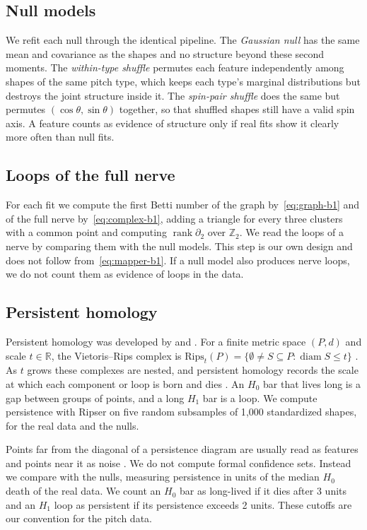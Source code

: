 \documentclass{article}
\newcommand{\R}{\mathbb{R}}
\newcommand{\Z}{\mathbb{Z}}
\DeclareMathOperator{\rank}{rank}
\DeclareMathOperator{\diam}{diam}
\theoremstyle{definition}
\theoremstyle{remark}
\begin{document}
\subsection{Null models}
We refit each null through the identical pipeline.
The \emph{Gaussian null} has the same mean and covariance as the shapes and no structure beyond these second moments.
The \emph{within-type shuffle} permutes each feature independently among shapes of the same pitch type, which keeps each type's marginal distributions but destroys the joint structure inside it.
The \emph{spin-pair shuffle} does the same but permutes $(\cos\theta, \sin\theta)$ together, so that shuffled shapes still have a valid spin axis.
A feature counts as evidence of structure only if real fits show it clearly more often than null fits.

\subsection{Loops of the full nerve}
For each fit we compute the first Betti number of the graph by~\eqref{eq:graph-b1} and of the full nerve by~\eqref{eq:complex-b1}, adding a triangle for every three clusters with a common point and computing $\rank \partial_2$ over $\Z_2$.
We read the loops of a nerve by comparing them with the null models. This step is our own design and does not follow from~\eqref{eq:mapper-b1}. If a null model also produces nerve loops, we do not count them as evidence of loops in the data.

\subsection{Persistent homology}
Persistent homology was developed by \textcite{edelsbrunnerletscherzomorodian2002} and \textcite{zomorodiancarlsson2005}.
For a finite metric space $(P, d)$ and scale $t \in \R$, the Vietoris--Rips complex is $\mathrm{Rips}_t(P) = \{ \emptyset \neq S \subseteq P : \diam S \le t \}$ \parencite{bauer2021ripser}.
As $t$ grows these complexes are nested, and persistent homology records the scale at which each component or loop is born and dies \parencite{edelsbrunnerletscherzomorodian2002,zomorodiancarlsson2005}.
An $H_0$ bar that lives long is a gap between groups of points, and a long $H_1$ bar is a loop.
We compute persistence with Ripser \parencite{bauer2021ripser,tralie2018ripserpy} on five random subsamples of 1{,}000 standardized shapes, for the real data and the nulls.

Points far from the diagonal of a persistence diagram are usually read as features and points near it as noise \parencite{fasy2014confidence}.
We do not compute formal confidence sets. Instead we compare with the nulls, measuring persistence in units of the median $H_0$ death of the real data.
We count an $H_0$ bar as long-lived if it dies after 3 units and an $H_1$ loop as persistent if its persistence exceeds 2 units. These cutoffs are our convention for the pitch data.
\end{document}
